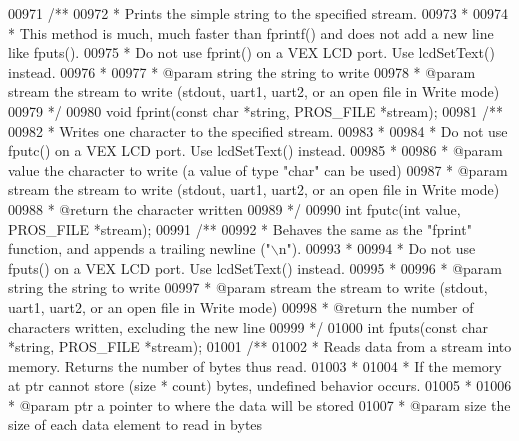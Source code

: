\begin{DoxyCode}
00971 \textcolor{comment}{/**}
00972 \textcolor{comment}{ * Prints the simple string to the specified stream.}
00973 \textcolor{comment}{ *}
00974 \textcolor{comment}{ * This method is much, much faster than fprintf() and does not add a new line like fputs().}
00975 \textcolor{comment}{ * Do not use fprint() on a VEX LCD port. Use lcdSetText() instead.}
00976 \textcolor{comment}{ *}
00977 \textcolor{comment}{ * @param string the string to write}
00978 \textcolor{comment}{ * @param stream the stream to write (stdout, uart1, uart2, or an open file in Write mode)}
00979 \textcolor{comment}{ */}
00980 \textcolor{keywordtype}{void} fprint(\textcolor{keyword}{const} \textcolor{keywordtype}{char} *string, PROS_FILE *stream);
00981 \textcolor{comment}{/**}
00982 \textcolor{comment}{ * Writes one character to the specified stream.}
00983 \textcolor{comment}{ *}
00984 \textcolor{comment}{ * Do not use fputc() on a VEX LCD port. Use lcdSetText() instead.}
00985 \textcolor{comment}{ *}
00986 \textcolor{comment}{ * @param value the character to write (a value of type "char" can be used)}
00987 \textcolor{comment}{ * @param stream the stream to write (stdout, uart1, uart2, or an open file in Write mode)}
00988 \textcolor{comment}{ * @return the character written}
00989 \textcolor{comment}{ */}
00990 \textcolor{keywordtype}{int} fputc(\textcolor{keywordtype}{int} value, PROS_FILE *stream);
00991 \textcolor{comment}{/**}
00992 \textcolor{comment}{ * Behaves the same as the "fprint" function, and appends a trailing newline ("\(\backslash\)n").}
00993 \textcolor{comment}{ *}
00994 \textcolor{comment}{ * Do not use fputs() on a VEX LCD port. Use lcdSetText() instead.}
00995 \textcolor{comment}{ *}
00996 \textcolor{comment}{ * @param string the string to write}
00997 \textcolor{comment}{ * @param stream the stream to write (stdout, uart1, uart2, or an open file in Write mode)}
00998 \textcolor{comment}{ * @return the number of characters written, excluding the new line}
00999 \textcolor{comment}{ */}
01000 \textcolor{keywordtype}{int} fputs(\textcolor{keyword}{const} \textcolor{keywordtype}{char} *string, PROS_FILE *stream);
01001 \textcolor{comment}{/**}
01002 \textcolor{comment}{ * Reads data from a stream into memory. Returns the number of bytes thus read.}
01003 \textcolor{comment}{ *}
01004 \textcolor{comment}{ * If the memory at ptr cannot store (size * count) bytes, undefined behavior occurs.}
01005 \textcolor{comment}{ *}
01006 \textcolor{comment}{ * @param ptr a pointer to where the data will be stored}
01007 \textcolor{comment}{ * @param size the size of each data element to read in bytes}

\end{DoxyCode}
